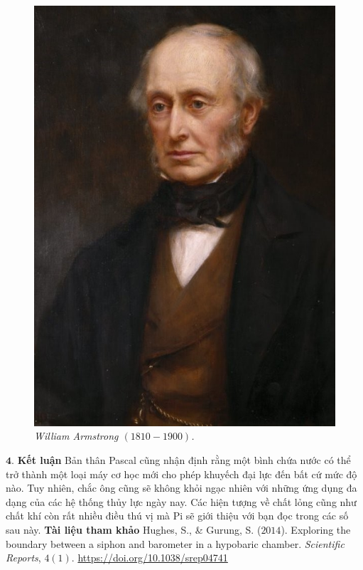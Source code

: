 \begin{multicols}{2}
\begin{figure}[H]
		\includegraphics[width= 1\linewidth]{27}
		\caption{\small\textit{\color{timhieukhoahoc}William Armstrong $(1810 - 1900)$.}}
		\vspace*{-10pt}
	\end{figure}
	$\pmb{4.}$ \textbf{\color{timhieukhoahoc}Kết luận}
	\vskip 0.1cm
	Bản thân Pascal cũng nhận định rằng một bình chứa nước có thể trở thành một loại máy cơ học mới cho phép khuyếch đại lực đến bất cứ mức độ nào. Tuy nhiên, chắc ông cũng sẽ không khỏi ngạc nhiên với những ứng dụng đa dạng của các hệ thống thủy lực ngày nay. Các hiện tượng về chất lỏng cũng như chất khí còn rất nhiều điều thú vị mà Pi sẽ giới thiệu với bạn đọc trong các số sau này.
	\vskip 0.1cm
	\textbf{\color{timhieukhoahoc}Tài liệu tham khảo}
	\vskip 0.1cm
	Hughes, S., \& Gurung, S. ($2014$). Exploring the boundary between a siphon and barometer in a hypobaric chamber. \textit{Scientific Reports}, $4(1)$. \url{https://doi.org/10.1038/srep04741}
\end{multicols}


